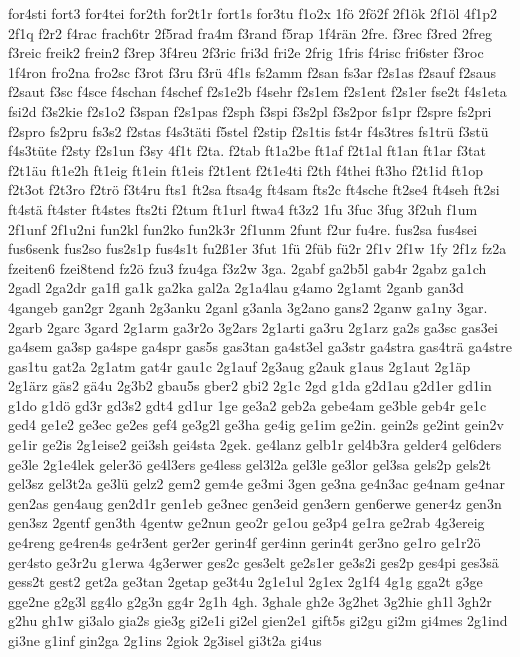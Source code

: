 {for4sti
fort3
for4tei
for2th
for2t1r
fort1s
for3tu
f1o2x
1fö
2fö2f
2f1ök
2f1öl
4f1p2
2f1q
f2r2
f4rac
frach6tr
2f5rad
fra4m
f3rand
f5rap
1f4rän
2fre.
f3rec
f3red
2freg
f3reic
freik2
frein2
f3rep
3f4reu
2f3ric
fri3d
fri2e
2frig
1fris
f4risc
fri6ster
f3roc
1f4ron
fro2na
fro2sc
f3rot
f3ru
f3rü
4f1s
fs2amm
f2san
fs3ar
f2s1as
f2sauf
f2saus
f2saut
f3sc
f4sce
f4schan
f4schef
f2s1e2b
f4sehr
f2s1em
f2s1ent
f2s1er
fse2t
f4s1eta
fsi2d
f3s2kie
f2s1o2
f3span
f2s1pas
f2sph
f3spi
f3s2pl
f3s2por
fs1pr
f2spre
fs2pri
f2spro
fs2pru
fs3s2
f2stas
f4s3täti
f5stel
f2stip
f2s1tis
fst4r
f4s3tres
fs1trü
f3stü
f4s3tüte
f2sty
f2s1un
f3sy
4f1t
f2ta.
f2tab
ft1a2be
ft1af
f2t1al
ft1an
ft1ar
f3tat
f2t1äu
ft1e2h
ft1eig
ft1ein
ft1eis
f2t1ent
f2t1e4ti
f2th
f4thei
ft3ho
f2t1id
ft1op
f2t3ot
f2t3ro
f2trö
f3t4ru
fts1
ft2sa
ftsa4g
ft4sam
fts2c
ft4sche
ft2se4
ft4seh
ft2si
ft4stä
ft4ster
ft4stes
fts2ti
f2tum
ft1url
ftwa4
ft3z2
1fu
3fuc
3fug
3f2uh
f1um
2f1unf
2f1u2ni
fun2kl
fun2ko
fun2k3r
2f1unm
2funt
f2ur
fu4re.
fus2sa
fus4sei
fus6senk
fus2so
fus2s1p
fus4s1t
fu2ß1er
3fut
1fü
2füb
fü2r
2f1v
2f1w
1fy
2f1z
fz2a
fzeiten6
fzei8tend
fz2ö
fzu3
fzu4ga
f3z2w
3ga.
2gabf
ga2b5l
gab4r
2gabz
ga1ch
2gadl
2ga2dr
ga1fl
ga1k
ga2ka
gal2a
2g1a4lau
g4amo
2g1amt
2ganb
gan3d
4gangeb
gan2gr
2ganh
2g3anku
2ganl
g3anla
3g2ano
gans2
2ganw
ga1ny
3gar.
2garb
2garc
3gard
2g1arm
ga3r2o
3g2ars
2g1arti
ga3ru
2g1arz
ga2s
ga3sc
gas3ei
ga4sem
ga3sp
ga4spe
ga4spr
gas5s
gas3tan
ga4st3el
ga3str
ga4stra
gas4trä
ga4stre
gas1tu
gat2a
2g1atm
gat4r
gau1c
2g1auf
2g3aug
g2auk
g1aus
2g1aut
2g1äp
2g1ärz
gäs2
gä4u
2g3b2
gbau5s
gber2
gbi2
2g1c
2gd
g1da
g2d1au
g2d1er
gd1in
g1do
g1dö
gd3r
gd3s2
gdt4
gd1ur
1ge
ge3a2
geb2a
gebe4am
ge3ble
geb4r
ge1c
ged4
ge1e2
ge3ec
ge2es
gef4
ge3g2l
ge3ha
ge4ig
ge1im
ge2in.
gein2s
ge2int
gein2v
ge1ir
ge2is
2g1eise2
gei3sh
gei4sta
2gek.
ge4lanz
gelb1r
gel4b3ra
gelder4
gel6ders
ge3le
2g1e4lek
geler3ö
ge4l3ers
ge4less
gel3l2a
gel3le
ge3lor
gel3sa
gels2p
gels2t
gel3sz
gel3t2a
ge3lü
gelz2
gem2
gem4e
ge3mi
3gen
ge3na
ge4n3ac
ge4nam
ge4nar
gen2as
gen4aug
gen2d1r
gen1eb
ge3nec
gen3eid
gen3ern
gen6erwe
gener4z
gen3n
gen3sz
2gentf
gen3th
4gentw
ge2nun
geo2r
ge1ou
ge3p4
ge1ra
ge2rab
4g3ereig
ge4reng
ge4ren4s
ge4r3ent
ger2er
gerin4f
ger4inn
gerin4t
ger3no
ge1ro
ge1r2ö
ger4sto
ge3r2u
g1erwa
4g3erwer
ges2c
ges3elt
ge2s1er
ge3s2i
ges2p
ges4pi
ges3sä
gess2t
gest2
get2a
ge3tan
2getap
ge3t4u
2g1e1ul
2g1ex
2g1f4
4g1g
gga2t
g3ge
gge2ne
g2g3l
gg4lo
g2g3n
gg4r
2g1h
4gh.
3ghale
gh2e
3g2het
3g2hie
gh1l
3gh2r
g2hu
gh1w
gi3alo
gia2s
gie3g
gi2e1i
gi2el
gien2e1
gift5s
gi2gu
gi2m
gi4mes
2g1ind
gi3ne
g1inf
gin2ga
2g1ins
2giok
2g3isel
gi3t2a
gi4us
}
